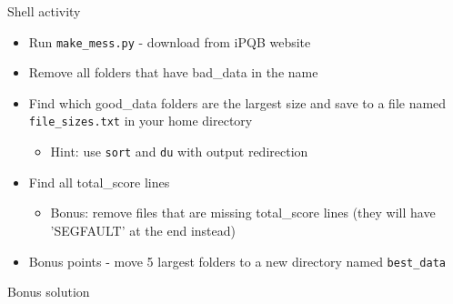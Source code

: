\begin{frame}{Shell activity}
  \begin{itemize}
  \item Run \texttt{make\_mess.py} - download from iPQB website
    \pause
  \item Remove all folders that have bad\_data in the name
  \item Find which good\_data folders are the largest size and save to
    a file named \texttt{file\_sizes.txt} in your home directory
    \begin{itemize}
    \item Hint: use \texttt{sort} and \texttt{du} with output redirection
    \end{itemize}
  \item Find all total\_score lines
    \begin{itemize}
    \item Bonus: remove files that are missing total\_score lines
      (they will have 'SEGFAULT' at the end instead)
    \end{itemize}
  \item Bonus points - move 5 largest folders to a new directory named
    \texttt{best\_data}
  \end{itemize}
\end{frame}

\begin{frame}{Bonus solution}
  \inputminted{bash}{code-snippets/bonus-shell-problem-solution.sh}
\end{frame}